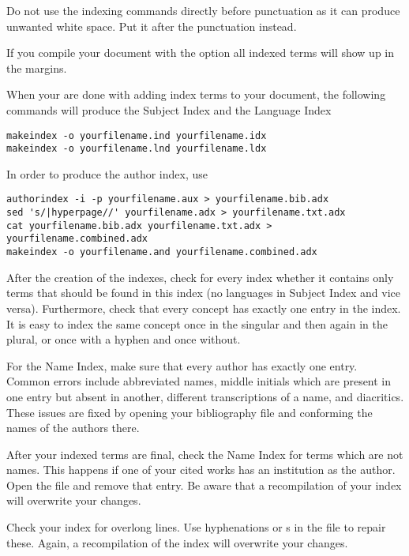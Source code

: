Do not use the indexing commands directly before punctuation as it can produce unwanted white space. Put it after the punctuation instead.

If you compile your document with the option  all indexed terms will show up in the margins.

When your are done with adding index terms to your document, the following commands will produce the Subject Index and the Language Index
\begin{verbatim}
makeindex -o yourfilename.ind yourfilename.idx
makeindex -o yourfilename.lnd yourfilename.ldx
\end{verbatim}
 
In order to produce the author index, use
% 
\begin{verbatim} 
authorindex -i -p yourfilename.aux > yourfilename.bib.adx
sed 's/|hyperpage//' yourfilename.adx > yourfilename.txt.adx 
cat yourfilename.bib.adx yourfilename.txt.adx > yourfilename.combined.adx
makeindex -o yourfilename.and yourfilename.combined.adx
\end{verbatim}

After the creation of the indexes, check for every index whether it contains only terms that should be found in this index (no languages in Subject Index and vice versa). Furthermore, check that every concept has exactly one entry in the index. It is easy to index the same concept once in the singular and then again in the plural, or once with a hyphen and once without. 

For the Name Index, make sure that every author has exactly one entry. Common errors include abbreviated names, middle initials which are present in one entry but absent in another, different transcriptions of a name, and diacritics. These issues are fixed by opening your bibliography file and conforming the names of the authors there.

After your indexed terms are final, check the Name Index for terms which are not names. This happens if one of your cited works has an institution as the author. Open the  file and remove that entry. Be aware that a recompilation of your index will overwrite your changes.

Check your index for overlong lines. Use hyphenations  or s in the  file to repair these. Again, a recompilation of the index will overwrite your changes.
